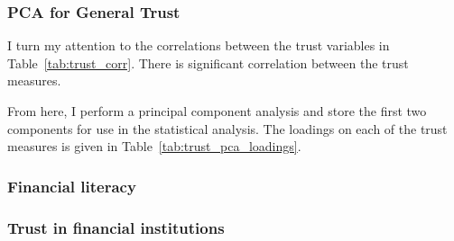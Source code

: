 \subsubsection{PCA for General Trust}

\par I turn my attention to the correlations between the trust variables in Table~\ref{tab:trust_corr}. There is significant correlation between the trust measures.  

\label{tab:trust_corr}

\par From here, I perform a principal component analysis and store the first two components for use in the statistical analysis. The loadings on each of the trust measures is given in Table~\ref{tab:trust_pca_loadings}.

\label{tab:trust_pca_loadings}

\subsubsection{Financial literacy}

\label{tab:finlit_r5_panel1}
\FloatBarrier

\label{tab:finlit_r5_panel2}
\FloatBarrier

\subsubsection{Trust in financial institutions}

\par

\label{tab:fin_trust_avg_cross_section}
\FloatBarrier

\label{tab:fin_trust_avg_avg}
\FloatBarrier

\par

\label{tab:fin_trust_pc1_wgen_cross_section}
\FloatBarrier

\label{tab:fin_trust_pc1_wgen_panel1}
\FloatBarrier

\label{tab:fin_trust_pc1_wgen_panel2}
\FloatBarrier

\par

\label{tab:fin_trust_pc2_wgen_cross_section}
\FloatBarrier

\label{tab:fin_trust_pc2_wgen_panel2}
\FloatBarrier